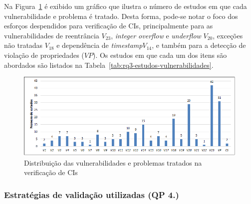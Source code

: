 
Na Figura~\ref{fig:rq3-vulnerabilidades} é exibido um gráfico que ilustra o número de estudos em que cada vulnerabilidade e problema é tratado. Desta forma, pode-se notar o foco dos esforços despendidos para verificação de CIs, principalmente para as vulnerabilidades de reentrância $V_{23}$, \textit{integer overflow} e \textit{underflow} $V_{20}$, exceções não tratadas $V_{18}$ e dependência de \textit{timestamp}$V_{14}$, e também para a detecção de violação de propriedades ($VP$). Os estudos em que cada um dos itens são abordados são listados na Tabela~\ref{tab:rq3-estudos-vulnerabilidades}.

\begin{figure}[!htb]
 \caption{Distribuição das vulnerabilidades e problemas tratados na verificação de CIs}
 \label{fig:rq3-vulnerabilidades}
 \centering
 \includegraphics[scale=0.7]{figuras/rq3-vulnerabilidades.png}
 \fdadospesquisa
\end{figure}



\subsubsection*{\textbf{Estratégias de validação utilizadas (\textbf{QP 4.})}}

